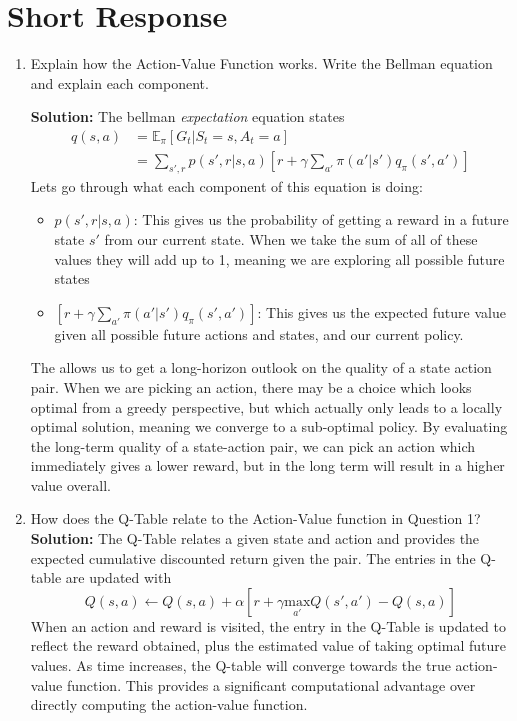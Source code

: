 \documentclass{exam}
\begin{document}
\section{Short Response}
\begin{enumerate}
    \item Explain how the Action-Value Function works. Write the Bellman equation and explain each component.
    
        \textbf{Solution:} The bellman \textit{expectation} equation states
    \begin{align*}
        q(s,a) &= \mathbb{E}_{\pi} \left[G_t | S_t = s, A_t = a \right]\\
               &= \sum_{s', r} p(s', r| s, a) \left[r + \gamma \sum_{a'} \pi(a'|s') q_{\pi}(s',a')\right]
    \end{align*}
    Lets go through what each component of this equation is doing:
    \begin{itemize}
        \item $p(s', r| s, a)$: This gives us the probability of getting a reward in a future state $s'$ from our current state. When we take the sum of all of these values they will add up to 1, meaning we are exploring all possible future states
        \item $\left[r + \gamma \sum_{a'} \pi(a'|s') q_{\pi}(s',a')\right]$: This gives us the expected future value given all possible future actions and states, and our current policy. 
    \end{itemize}
    
    The allows us to get a long-horizon outlook on the quality of a state action pair. When we are picking an action, there may be a choice which looks optimal from a greedy perspective, but which actually only leads to a locally optimal solution, meaning we converge to a sub-optimal policy. By evaluating the long-term quality of a state-action pair, we can pick an action which immediately gives a lower reward, but in the long term will result in a higher value overall.

    \item How does the Q-Table relate to the Action-Value function in Question 1?\\
        \textbf{Solution:} The Q-Table relates a given state and action and provides the expected cumulative discounted return given the pair. The entries in the Q-table are updated with
        \[Q(s,a) \leftarrow Q(s,a) + \alpha \left[r + \gamma \underset{a'}{\text{max}}Q(s',a') - Q(s,a) \right]\]
        When an action and reward is visited, the entry in the Q-Table is updated to reflect the reward obtained, plus the estimated value of taking optimal future values. As time increases, the Q-table will converge towards the true action-value function. This provides a significant computational advantage over directly computing the action-value function.
        

\end{enumerate}
\end{document}

